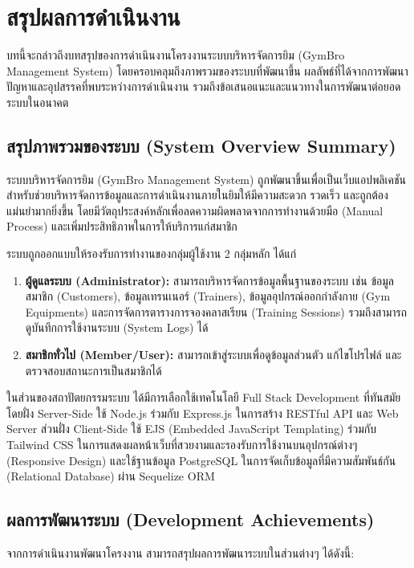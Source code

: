 \section{สรุปผลการดำเนินงาน}
\sloppy

บทนี้จะกล่าวถึงบทสรุปของการดำเนินงานโครงงานระบบบริหารจัดการยิม (GymBro Management System) โดยครอบคลุมถึงภาพรวมของระบบที่พัฒนาขึ้น ผลลัพธ์ที่ได้จากการพัฒนา ปัญหาและอุปสรรคที่พบระหว่างการดำเนินงาน รวมถึงข้อเสนอแนะและแนวทางในการพัฒนาต่อยอดระบบในอนาคต

\subsection{สรุปภาพรวมของระบบ (System Overview Summary)}
ระบบบริหารจัดการยิม (GymBro Management System) ถูกพัฒนาขึ้นเพื่อเป็นเว็บแอปพลิเคชันสำหรับช่วยบริหารจัดการข้อมูลและการดำเนินงานภายในยิมให้มีความสะดวก รวดเร็ว และถูกต้องแม่นยำมากยิ่งขึ้น โดยมีวัตถุประสงค์หลักเพื่อลดความผิดพลาดจากการทำงานด้วยมือ (Manual Process) และเพิ่มประสิทธิภาพในการให้บริการแก่สมาชิก

ระบบถูกออกแบบให้รองรับการทำงานของกลุ่มผู้ใช้งาน 2 กลุ่มหลัก ได้แก่
\begin{enumerate}
    \item \textbf{ผู้ดูแลระบบ (Administrator):} สามารถบริหารจัดการข้อมูลพื้นฐานของระบบ เช่น ข้อมูลสมาชิก (Customers), ข้อมูลเทรนเนอร์ (Trainers), ข้อมูลอุปกรณ์ออกกำลังกาย (Gym Equipments) และการจัดการตารางการจองคลาสเรียน (Training Sessions) รวมถึงสามารถดูบันทึกการใช้งานระบบ (System Logs) ได้
    \item \textbf{สมาชิกทั่วไป (Member/User):} สามารถเข้าสู่ระบบเพื่อดูข้อมูลส่วนตัว แก้ไขโปรไฟล์ และตรวจสอบสถานะการเป็นสมาชิกได้
\end{enumerate}

ในส่วนของสถาปัตยกรรมระบบ ได้มีการเลือกใช้เทคโนโลยี Full Stack Development ที่ทันสมัย โดยฝั่ง Server-Side ใช้ Node.js ร่วมกับ Express.js ในการสร้าง RESTful API และ Web Server ส่วนฝั่ง Client-Side ใช้ EJS (Embedded JavaScript Templating) ร่วมกับ Tailwind CSS ในการแสดงผลหน้าเว็บที่สวยงามและรองรับการใช้งานบนอุปกรณ์ต่างๆ (Responsive Design) และใช้ฐานข้อมูล PostgreSQL ในการจัดเก็บข้อมูลที่มีความสัมพันธ์กัน (Relational Database) ผ่าน Sequelize ORM

\subsection{ผลการพัฒนาระบบ (Development Achievements)}
จากการดำเนินงานพัฒนาโครงงาน สามารถสรุปผลการพัฒนาระบบในส่วนต่างๆ ได้ดังนี้:

